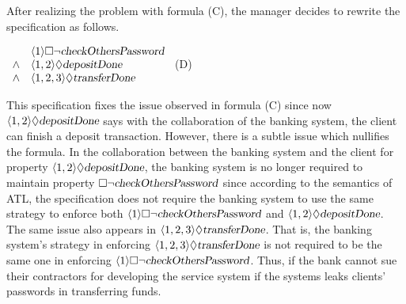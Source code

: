 \documentclass[11pt]{article}
\newcommand{\pfrr}{\Box}
\newcommand{\pevt}{\Diamond}
\begin{document}
After realizing the problem with formula (C), 
the manager decides to rewrite the specification as follows. 
\begin{center} \hfill 
$\begin{array}{cl}
		& \langle 1\rangle \pfrr\neg \mbox{\sl checkOthersPassword}\\
\wedge 	& \langle 1,2\rangle \pevt \mbox{\sl depositDone} \\
\wedge  & \langle 1,2, 3\rangle\pevt\mbox{\sl transferDone} 
\end{array}$
\hfill (D) 
\end{center}   
This specification fixes the issue observed in formula (C) since 
now $\langle 1,2\rangle\pevt\mbox{\sl depositDone}$ 
says with the collaboration of the banking system, 
the client can finish a deposit transaction.  
However, there is a subtle issue which nullifies the formula.  
In the collaboration between the banking system and the client 
for property $\langle 1,2\rangle\pevt\mbox{\sl depositDone}$, 
the banking system is no longer required to maintain property 
$\pfrr\neg \mbox{\sl checkOthersPassword}$ 
since according to the semantics of ATL, 
the specification does not require the banking system to 
use the same strategy to enforce 
both $\langle 1\rangle \pfrr\neg \mbox{\sl checkOthersPassword}$ and 
$\langle 1,2\rangle \pevt \mbox{\sl depositDone}$.  
The same issue also appears in $\langle 1,2,3\rangle\pevt\mbox{\sl transferDone}$.  
That is, the banking system's strategy in enforcing 
$\langle 1,2,3\rangle\pevt\mbox{\sl transferDone}$ is not required to be the same one 
in enforcing $\langle 1\rangle \pfrr\neg \mbox{\sl checkOthersPassword}$.  
Thus, if the bank cannot sue their contractors for developing the service system if 
the systems leaks clients' passwords in transferring funds.  
\end{document}
